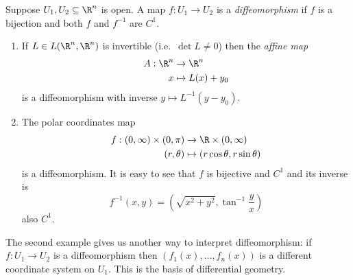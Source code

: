 \documentclass[a4paper]{article}
\theoremstyle{definition}
\begin{document}
\begin{definition}[Diffeomorphism]
  Suppose \(U_1, U_2 \subseteq \R^n\) is open. A map \(f: U_1 \to U_2\) is a \emph{diffeomorphism} if \(f\) is a bijection and both \(f\) and \(f^{-1}\) are \(C^1\).
\end{definition}

\begin{eg}\leavevmode
  \begin{enumerate}
  \item If \(L \in L(\R^n, \R^n)\) is invertible (i.e.\ \(\det L \neq 0\)) then the \emph{affine map}
    \begin{align*}
      A: \R^n &\to \R^n \\
      x &\mapsto L(x) + y_0
    \end{align*}
    is a diffeomorphism with inverse \(y \mapsto L^{-1}(y - y_0)\).
  \item The polar coordinates map
    \begin{align*}
      f: (0, \infty) \times (0, \pi) &\to \R \times (0, \infty) \\
      (r, \theta) &\mapsto (r \cos \theta, r \sin \theta)
    \end{align*}
    is a diffeomorphism. It is easy to see that \(f\) is bijective and \(C^1\) and its inverse is
    \[
      f^{-1}(x, y) = \left( \sqrt{x^2 + y^2}, \tan^{-1} \frac{y}{x} \right)
    \]
    also \(C^1\).
  \end{enumerate}
\end{eg}

The second example gives us another way to interpret diffeomorphism: if \(f: U_1 \to U_2\) is a diffeomorphism then \((f_1(x), \dots, f_n(x))\) is a different coordinate system on \(U_1\). This is the basis of differential geometry.
\end{document}
